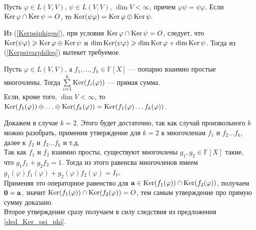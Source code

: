 \begin{sled}\label{sledsled_Ker_psi_phi}
Пусть  $\varphi \in L(V, V)$, $\psi \in L(V, V)$, $\dim V <\infty$, 
причем $\varphi \psi = \psi \varphi $.
Если $\mathop{\rm Ker}\nolimits  \varphi \cap  \mathop{\rm Ker}\nolimits  \psi = O$, то 
$\mathop{\rm Ker}\nolimits (\psi \varphi ) =\mathop{\rm Ker}\nolimits  \varphi \oplus \mathop{\rm Ker}\nolimits  \psi .$
\end{sled}
\dok Из (\ref{Kerpsiphigeq}), при условии $\mathop{\rm Ker}\nolimits  \varphi \cap  \mathop{\rm Ker}\nolimits  \psi = O$,
следует, что $\mathop{\rm Ker}\nolimits (\psi \varphi ) \geqslant \mathop{\rm Ker}\nolimits  \varphi \oplus \mathop{\rm Ker}\nolimits  \psi $ и
$\mathop{\rm dim}\nolimits \mathop{\rm Ker}\nolimits (\psi \varphi ) \geqslant \mathop{\rm dim}\nolimits \mathop{\rm Ker}\nolimits  \varphi + \mathop{\rm dim}\nolimits \mathop{\rm Ker}\nolimits  \psi$.
Тогда из (\ref{Kerpsivarphileq}) вытекет требуемое.
\edok

\begin{predl}\label{Ker_polynom}
Пусть $\varphi \in L(V, V)$, а $f_1, \ldots, f_k\in \mathbb{F}[X]$ --- попарно взаимно простые многочлены.
Тогда $\sum\limits_{i=1}^k \mathop{\rm Ker}\nolimits (f_i(\varphi) )$ --- прямая сумма. \\
Если, кроме того,   $\dim V<\infty$, то $\mathop{\rm Ker}\nolimits (f_1(\varphi) ) \oplus \ldots \oplus 
\mathop{\rm Ker}\nolimits (f_k(\varphi) ) = \mathop{\rm Ker}\nolimits (f_1(\varphi)\ldots f_k(\varphi) )$.
\end{predl}
\dok Докажем в случае  $k=2$. Этого будет достаточно, так как случай произвольного $k$ 
можно разобрать,  применив утверждение для $k=2$ к многочленам
$f_1$ и $f_2\ldots f_k$, далее к $f_2$ и $f_3\ldots f_k$ и т.д.\\
Так как $f_1$ и $f_2$ взаимно просты, существуют многочлены 
$g_1, g_2\in \mathbb{F}[X]$  такие, что $g_1f_1+g_2f_2=1$.
Тогда из этого равенсва многочленов  имеем 
$g_1 (\varphi)f_1(\varphi)+g_2(\varphi)f_2(\varphi)=I_V$.\\
Применяя это операторное равенство для $\mathbf{a}\in \mathop{\rm Ker}\nolimits (f_1(\varphi) ) \cap \mathop{\rm Ker}\nolimits (f_2(\varphi) ) $, 
получаем $\mathbf{0}=\mathbf{a}$, значит 
$\mathop{\rm Ker}\nolimits (f_1(\varphi) ) \cap \mathop{\rm Ker}\nolimits (f_2(\varphi) ) =O$, тем самым утверждение про прямую сумму доказано.
\\
Второе утверждение сразу получаем в силу следствия из предложения \ref{sled_Ker_psi_phi}.
\edok




